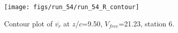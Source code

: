 \begin{figure}[H]
\centering
\texttt{[image: figs/run\_54/run\_54\_R\_contour]}
\caption{Contour plot of $\overline{v_{r}}$ at $z/c$=9.50, $V_{free}$=21.23, station 6.}
\label{fig:run_54_R_contour}
\end{figure}


